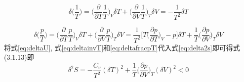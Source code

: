 \begin{solution}
\begin{equation}\label{eq:deltainvT}
\delta \bigg(\frac{1}{T}\bigg) = \bigg(\frac{\partial}{\partial T}\frac{1}{T}\bigg)_V \delta T + \bigg(\frac{\partial}{\partial V}\frac{1}{T}\bigg)_T\delta V = -\frac{1}{T^2}\delta T 
\end{equation}

\begin{equation}\label{eq:deltafracpT}
\delta \bigg(\frac{p}{T}\bigg) = \bigg(\frac{\partial}{\partial T}\frac{p}{T}\bigg)_V \delta T + \bigg(\frac{\partial}{\partial V}\frac{p}{T}\bigg)_T \delta V 
= \frac{1}{T^2}\Bigg[ T\bigg(\frac{\partial p}{\partial T}\bigg)_V - p \Bigg]\delta T + \frac{1}{T}\bigg(\frac{\partial p}{\partial V}\bigg)_T \delta V
\end{equation}
将式\ref{eq:deltaU}, 式\ref{eq:deltainvT}和\ref{eq:deltafracpT}代入式\ref{eq:delta2s}即可得式(3.1.13)即
\[
\delta^2 S = -\frac{C_v}{T^2}(\delta T)^2 + \frac{1}{T}\bigg(\frac{\partial p}{\partial V}\bigg)_T(\delta V)^2 < 0
\]
\end{solution}
